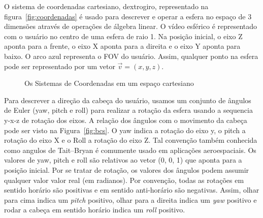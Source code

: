 O sistema de coordenadas cartesiano, dextrogiro, representado na figura~\ref{fig:coordenadas} é usado para descrever e operar a esfera no espaço de 3 dimensões através de operações de álgebra linear. O vídeo esférico é representado com o usuário no centro de uma esfera de raio 1. Na posição inicial, o eixo Z aponta para a frente, o eixo X aponta para a direita e o eixo Y aponta para baixo. O arco azul representa o FOV do usuário. Assim, qualquer ponto na esfera pode ser representado por um vetor $ \overrightarrow{v} = (x,y,z) $.

\begin{figure}[h]
	\centering
	 \quad	 \quad
	\caption{Os Sistemas de Coordenadas em um espaço cartesiano}
	\label{fig:coord_sis}
\end{figure}

Para descrever a direção da cabeça do usuário, usamos um conjunto de ângulos de Euler (yaw, pitch e roll) para realizar a rotação da esfera usando a sequencia y-x-z de rotação dos eixos. A relação dos ângulos com o movimento da cabeça pode ser visto na Figura~\ref{fig:bcs}. O yaw indica a rotação do eixo y, o pitch a rotação do eixo X e o Roll a rotação do eixo Z. Tal convenção também conhecida como angulos de Tait–Bryan é comumente usado em aplicações aeroespaciais. Os valores de yaw, pitch e roll são relativos ao vetor (0, 0, 1) que aponta para a posição inicial. Por se tratar de rotação, os valores dos ângulos podem assumir qualquer valor valor real (em radianos). Por convenção, todas as rotações em sentido horário são positivas e em sentido anti-horário são negativas. Assim, olhar para cima indica um \textit{pitch} positivo, olhar para a direita indica um \textit{yaw} positivo e rodar a cabeça em sentido horário indica um \textit{roll} positivo.


